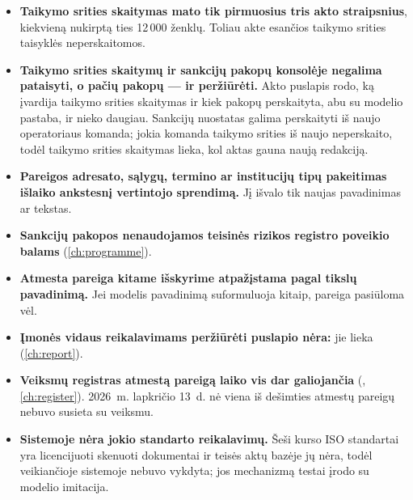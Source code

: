 \begin{itemize}
  \item \textbf{Taikymo srities skaitymas mato tik pirmuosius tris akto straipsnius}, kiekvieną
    nukirptą ties 12\,000 ženklų. Toliau akte esančios taikymo srities taisyklės neperskaitomos.
  \item \textbf{Taikymo srities skaitymų ir sankcijų pakopų konsolėje negalima pataisyti, o
    pačių pakopų --- ir peržiūrėti.} Akto puslapis rodo, ką įvardija taikymo srities skaitymas
    ir kiek pakopų perskaityta, abu su modelio pastaba, ir nieko daugiau. Sankcijų nuostatas
    galima perskaityti iš naujo operatoriaus komanda; jokia
    komanda taikymo srities iš naujo neperskaito, todėl taikymo srities skaitymas lieka, kol
    aktas gauna naują redakciją.
  \item \textbf{Pareigos adresato, sąlygų, termino ar institucijų tipų pakeitimas išlaiko
    ankstesnį vertintojo sprendimą.} Jį išvalo tik naujas pavadinimas ar tekstas.
  \item \textbf{Sankcijų pakopos nenaudojamos teisinės rizikos registro poveikio balams}
    (\cref{ch:programme}).
  \item \textbf{Atmesta pareiga kitame išskyrime atpažįstama pagal tikslų pavadinimą.} Jei
    modelis pavadinimą suformuluoja kitaip, pareiga pasiūloma vėl.
  \item \textbf{Įmonės vidaus reikalavimams peržiūrėti puslapio nėra:} jie lieka
     (\cref{ch:report}).
  \item \textbf{Veiksmų registras atmestą pareigą laiko vis dar galiojančia}
    (, \cref{ch:register}). 2026~m. lapkričio 13~d. nė viena iš dešimties
    atmestų pareigų nebuvo susieta su veiksmu.
  \item \textbf{Sistemoje nėra jokio standarto reikalavimų.} Šeši kurso ISO standartai yra
    licencijuoti skenuoti dokumentai ir teisės aktų bazėje jų nėra, todėl
     veikiančioje sistemoje nebuvo vykdyta; jos mechanizmą
    testai įrodo su modelio imitacija.
\end{itemize}
